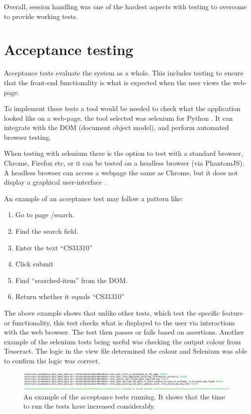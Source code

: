 Overall, session handling was one of the hardest aspects with testing to overcome to provide working tests.

\section{Acceptance testing}
Acceptance tests evaluate the system as a whole. This includes testing to ensure that the front-end functionality is what is expected when the user views the web-page.

To implement these tests a tool would be needed to check what the application looked like on a web-page, the tool selected was selenium for Python \cite{citeulike:14020625}. It can integrate with the DOM (document object model), and perform automated browser testing.

When testing with selenium there is the option to test with a standard browser, Chrome, Firefox etc, or it can be tested on a headless browser (via PhantomJS). A headless browser can access a webpage the same as Chrome, but it does not display a graphical user-interface \cite{citeulike:13983611}.

An example of an acceptance test may follow a pattern like:
\begin{enumerate}
  \item Go to page /search.
  \item Find the search field.
  \item Enter the text ``CS31310''
  \item Click submit
  \item Find ``searched-item'' from the DOM.
  \item Return whether it equals ``CS31310''
\end{enumerate}

The above example shows that unlike other tests, which test the specific feature or functionality, this test checks what is displayed to the user via interactions with the web browser. The test then passes or fails based on assertions. Another example of the selenium tests being useful was checking the output colour from Tesseract. The logic in the view file determined the colour and Selenium was able to confirm the logic was correct.

\begin{figure}[h!]
  \centering
  \includegraphics[width=\textwidth]{images/acceptance_test_1}
  \caption{An example of the acceptance tests running. It shows that the time to run the tests have increased considerably.}
  \label{fig:acceptance_test_1}
\end{figure}

